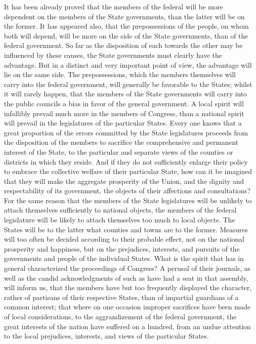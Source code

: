 It has been already proved that the members of the federal will be more dependent on the members of the State governments, than the latter will be on the former. 
It has appeared also, that the prepossessions of the people, on whom both will depend, will be more on the side of the State governments, than of the federal government. 
So far as the disposition of each towards the other may be influenced by these causes, the State governments must clearly have the advantage. 
But in a distinct and very important point of view, the advantage will lie on the same side. 
The prepossessions, which the members themselves will carry into the federal government, will generally be favorable to the States; whilst it will rarely happen, that the members of the State governments will carry into the public councils a bias in favor of the general government. 
A local spirit will infallibly prevail much more in the members of Congress, than a national spirit will prevail in the legislatures of the particular States. 
Every one knows that a great proportion of the errors committed by the State legislatures proceeds from the disposition of the members to sacrifice the comprehensive and permanent interest of the State, to the particular and separate views of the counties or districts in which they reside. 
And if they do not sufficiently enlarge their policy to embrace the collective welfare of their particular State, how can it be imagined that they will make the aggregate prosperity of the Union, and the dignity and respectability of its government, the objects of their affections and consultations? 
For the same reason that the members of the State legislatures will be unlikely to attach themselves sufficiently to national objects, the members of the federal legislature will be likely to attach themselves too much to local objects. 
The States will be to the latter what counties and towns are to the former. 
Measures will too often be decided according to their probable effect, not on the national prosperity and happiness, but on the prejudices, interests, and pursuits of the governments and people of the individual States. 
What is the spirit that has in general characterized the proceedings of Congress? 
A perusal of their journals, as well as the candid acknowledgments of such as have had a seat in that assembly, will inform us, that the members have but too frequently displayed the character, rather of partisans of their respective States, than of impartial guardians of a common interest; that where on one occasion improper sacrifices have been made of local considerations, to the aggrandizement of the federal government, the great interests of the nation have suffered on a hundred, from an undue attention to the local prejudices, interests, and views of the particular States. 
